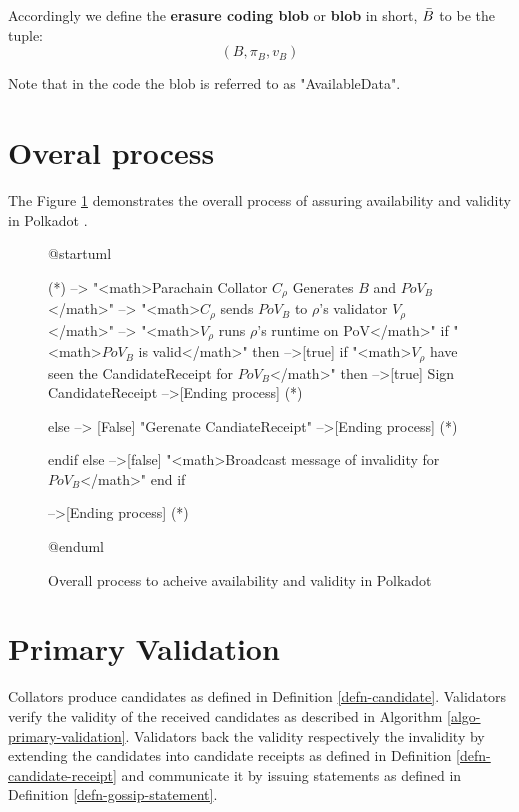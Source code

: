 \begin{definition}
  \label{defn-blob}
  Accordingly we define the {\bf erasure coding blob} or {\bf blob} in short, {\bf $\bar{B}$} to be the tuple:
  \[
  (B, \pi_B, v_B)
  \]
\end{definition}

Note that in the code the blob is referred to as "AvailableData".


\section{Overal process}

The Figure \ref{diag-anv-overall} demonstrates the overall process of assuring availability and validity in Polkadot .

\begin{figure}[h!]
\label{diag-anv-overall}
\begin{plantuml}
@startuml

(*) --> "<math>Parachain Collator $C_\rho$ Generates  $B$ and $PoV_B$</math>"
    --> "<math>$C_\rho$ sends $PoV_B$ to $\rho$'s validator $V_\rho$</math>"
    --> "<math>$V_{\rho}$ runs $\rho$'s runtime on PoV</math>"
    if "<math>$PoV_B$ is valid</math>" then
    -->[true] if  "<math>$V_{\rho}$ have seen the CandidateReceipt for $PoV_B$</math>" then
    -->[true] Sign CandidateReceipt
    -->[Ending process] (*)

    else
    --> [False] "Gerenate CandiateReceipt"
    -->[Ending process] (*)

    endif
    else
    -->[false] "<math>Broadcast message of invalidity for $PoV_B$</math>"
    end if

  -->[Ending process] (*)

@enduml
\end{plantuml}
\caption{Overall process to acheive availability and validity in Polkadot}
\end{figure}

\section{Primary Validation}
\label{sect-primary-validation}

Collators produce candidates as defined in Definition \ref{defn-candidate}.
Validators verify the validity of the received candidates as described in
Algorithm \ref{algo-primary-validation}.  Validators
back the validity respectively the invalidity by extending the candidates into 
candidate receipts as defined in Definition \ref{defn-candidate-receipt} and
communicate it by issuing statements as defined in Definition
\ref{defn-gossip-statement}.
\newline

